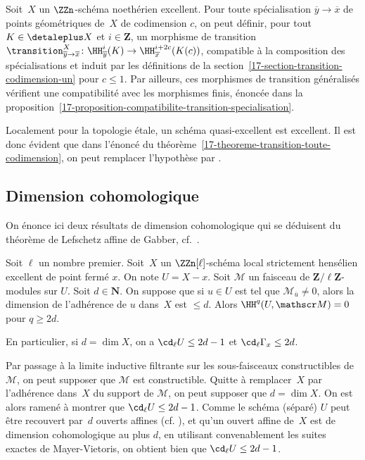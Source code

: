 \documentclass[10pt]{../fichiers-configuration-latex/smfart}
\begin{document}
\begin{theoreme2}\label{17-theoreme-transition-toute-codimension}
Soit $X$ un $\ZZn$-schéma noethérien
excellent. Pour toute spécialisation $\overline
y\to\overline x$ de points géométriques de $X$ de codimension $c$, on peut
définir, pour tout $K\in\detaleplus X$ et $i\in\mathbf{Z}$, un morphisme de
transition $\transition^X_{\overline y\to\overline x}\colon \HH^i_{\overline
y}(K)\to \HH^{i+2c}_{\overline x}(K(c))$, compatible à la composition des
spécialisations et induit par les définitions de la 
section~\ref{17-section-transition-codimension-un} pour $c\leq 1$. Par
ailleurs, ces morphismes de transition généralisés vérifient une
compatibilité avec les morphismes finis, énoncée dans la
proposition~\ref{17-proposition-compatibilite-transition-specialisation}.
\end{theoreme2}

\begin{remarque2}
Localement pour la topologie étale, un schéma quasi-excellent est
excellent. Il est donc évident que dans l'énoncé du
théorème~\ref{17-theoreme-transition-toute-codimension}, on peut remplacer
l'hypothèse  par .
\end{remarque2}

\subsection{Dimension cohomologique}%

On énonce ici deux résultats de dimension cohomologique qui se déduisent du
théorème de Lefschetz affine de Gabber,
cf.~.

\begin{proposition2}\label{17-proposition-dimension-cohomologique}
Soit $\ell$ un nombre premier.
Soit $X$ un $\ZZn[\ell]$-schéma local strictement hensélien excellent 
de point fermé
$x$. On note $U=X-x$. Soit $\mathscr M$ un faisceau de
$\mathbf{Z}/\ell\mathbf{Z}$-modules
sur $U$. Soit $d\in\mathbf{N}$. On suppose que si $u\in U$ est tel que
${\mathscr M}_{\overline u}\neq 0$, alors la dimension de l'adhérence de
$u$ dans $X$ est $\leq d$. Alors $\HH^q(U,\mathscr M)=0$ pour $q\geq 2d$.

En particulier, si $d=\dim X$, on a $\cd_\ell U\leq 2d-1$ et $\cd_\ell
\Gamma_x\leq 2d$.
\end{proposition2}

Par passage à la limite inductive filtrante sur les sous-faisceaux
constructibles de $\mathscr M$, on peut supposer que $\mathscr M$ est
constructible. Quitte à remplacer $X$ par 
l'adhérence dans $X$ du support de $\mathscr M$, on peut supposer que
$d=\dim X$. On est alors ramené à montrer que $\cd_\ell U\leq 2d-1$.
Comme le schéma (séparé)
$U$ peut être recouvert par $d$ ouverts affines (cf.
\cite[§B.3, Chapitre~III]{Algebre@Serre}), et qu'un
ouvert affine de $X$ est de dimension cohomologique au plus 
$d$, en utilisant convenablement les suites exactes de Mayer-Vietoris,
on obtient bien que $\cd_\ell U\leq 2d-1$.
\end{document}
